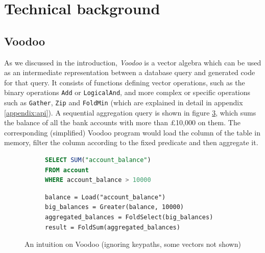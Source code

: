 \section{Technical background}
\label{section:tech}

\subsection{Voodoo}\label{original-voodoo-impl}

As we discussed in the introduction, \emph{Voodoo} \cite{Pirk:2016:VVA:3007328.3007336} is a vector algebra which can be used as an intermediate representation between a database query and generated code for that query. It consists of functions defining vector operations, such as the binary operations \texttt{Add} or \texttt{LogicalAnd}, and more complex or specific operations such as \texttt{Gather}, \texttt{Zip} and \texttt{FoldMin} (which are explained in detail in appendix \ref{appendix:api}). A sequential aggregation query is shown in figure \ref{fig:short-query}, which sums the balance of all the bank accounts with more than £10,000 on them. The corresponding (simplified) Voodoo program would load the column of the table in memory, filter the column according to the fixed predicate and then aggregate it.

\begin{figure}[h]
    \centering
\begin{subfigure}[h]{0.39\textwidth}
    \centering
\begin{lstlisting}[language=SQL]
SELECT SUM("account_balance")
FROM account
WHERE account_balance > 10000
\end{lstlisting}
    \label{fig:short-query-sql}
\end{subfigure}
\begin{subfigure}[h]{0.59\textwidth}
    \centering
\begin{lstlisting}
balance = Load("account_balance")
big_balances = Greater(balance, 10000)
aggregated_balances = FoldSelect(big_balances)
result = FoldSum(aggregated_balances)
\end{lstlisting}
    \label{fig:short-query-vdl}
\end{subfigure}
    \caption{An intuition on Voodoo (ignoring keypaths, some vectors not shown)}
    \label{fig:short-query}
\end{figure}


